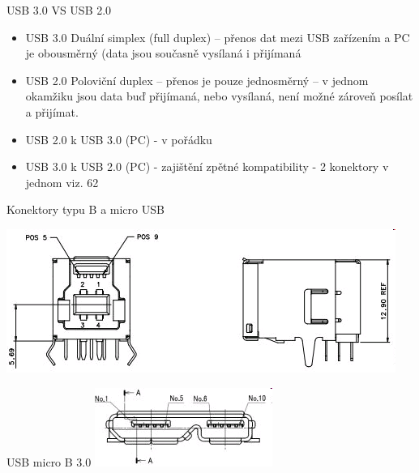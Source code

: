 \documentclass[aspectratio=43]{beamer}
\begin{document}
\begin{frame}{USB 3.0 VS USB 2.0}
	\begin{itemize}
		\item USB 3.0 Duální simplex (full duplex) – přenos dat mezi USB zařízením a PC je obousměrný (data jsou současně vysílaná i přijímaná
		\item USB 2.0 Poloviční duplex – přenos je pouze jednosměrný – v jednom okamžiku jsou data buď přijímaná, nebo vysílaná, není možné 
		      zároveň posílat a přijímat.
	\end{itemize}
	\vfill
	\begin{itemize}
		\item USB 2.0 k USB 3.0 (PC) - v pořádku
		\item USB 3.0 k USB 2.0 (PC) - zajištění zpětné kompatibility - 2 konektory v jednom viz. 62
	\end{itemize}
\end{frame}


\begin{frame}{Konektory typu B a micro USB}
	 
	\begin{center}
		\includegraphics[width=0.8\linewidth]{extrahovane_obrazky/img_3_page18_0.png}
	\end{center}
	
	\begin{center}
		USB micro B 3.0 
		\includegraphics[width=0.8\linewidth]{extrahovane_obrazky/img_3_page18_2.png}
	\end{center}
	
\end{frame}
\end{document}
